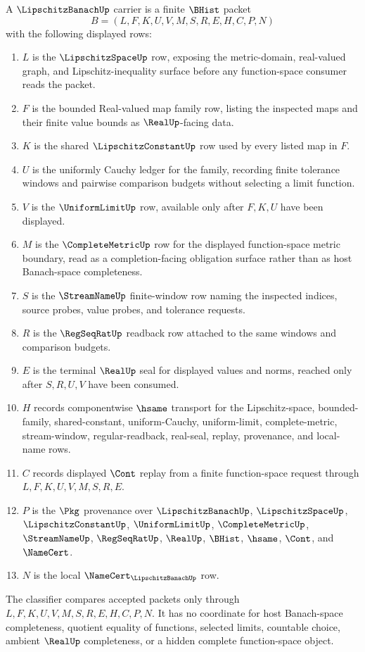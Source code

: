 \begin{definition}
\label{def:lipschitz-banach-carrier}
A $\LipschitzBanachUp$ carrier is a finite $\BHist$ packet
$$
B=(L,F,K,U,V,M,S,R,E,H,C,P,N)
$$
with the following displayed rows:
\begin{enumerate}
\item $L$ is the $\LipschitzSpaceUp$ row, exposing the metric-domain, real-valued graph, and Lipschitz-inequality surface before any function-space consumer reads the packet.
\item $F$ is the bounded Real-valued map family row, listing the inspected maps and their finite value bounds as $\RealUp$-facing data.
\item $K$ is the shared $\LipschitzConstantUp$ row used by every listed map in $F$.
\item $U$ is the uniformly Cauchy ledger for the family, recording finite tolerance windows and pairwise comparison budgets without selecting a limit function.
\item $V$ is the $\UniformLimitUp$ row, available only after $F,K,U$ have been displayed.
\item $M$ is the $\CompleteMetricUp$ row for the displayed function-space metric boundary, read as a completion-facing obligation surface rather than as host Banach-space completeness.
\item $S$ is the $\StreamNameUp$ finite-window row naming the inspected indices, source probes, value probes, and tolerance requests.
\item $R$ is the $\RegSeqRatUp$ readback row attached to the same windows and comparison budgets.
\item $E$ is the terminal $\RealUp$ seal for displayed values and norms, reached only after $S,R,U,V$ have been consumed.
\item $H$ records componentwise $\hsame$ transport for the Lipschitz-space, bounded-family, shared-constant, uniform-Cauchy, uniform-limit, complete-metric, stream-window, regular-readback, real-seal, replay, provenance, and local-name rows.
\item $C$ records displayed $\Cont$ replay from a finite function-space request through $L,F,K,U,V,M,S,R,E$.
\item $P$ is the $\Pkg$ provenance over $\LipschitzBanachUp$, $\LipschitzSpaceUp$, $\LipschitzConstantUp$, $\UniformLimitUp$, $\CompleteMetricUp$, $\StreamNameUp$, $\RegSeqRatUp$, $\RealUp$, $\BHist$, $\hsame$, $\Cont$, and $\NameCert$.
\item $N$ is the local $\NameCert_{\LipschitzBanachUp}$ row.
\end{enumerate}
The classifier compares accepted packets only through $L,F,K,U,V,M,S,R,E,H,C,P,N$. It has no coordinate for host Banach-space completeness, quotient equality of functions, selected limits, countable choice, ambient $\RealUp$ completeness, or a hidden complete function-space object.
\end{definition}

